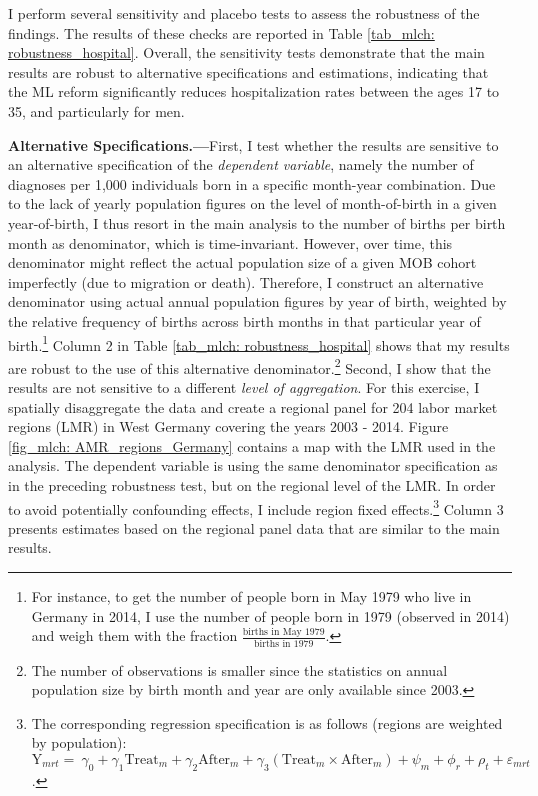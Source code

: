 I perform several sensitivity and placebo tests to assess the robustness of the findings. The results of these checks are reported in Table \ref{tab_mlch: robustness_hospital}. Overall, the sensitivity tests demonstrate that the main results are robust to alternative specifications and estimations, indicating that the ML reform significantly reduces hospitalization rates between the ages 17 to 35, and particularly for men.\newline

\afterpage{

}

\textbf{Alternative Specifications.---}First, I test whether the results are sensitive to an alternative specification of the \textit{dependent variable}, namely the number of diagnoses per 1,000 individuals born in a specific month-year combination. Due to the lack of yearly population figures on the level of month-of-birth in a given year-of-birth, I thus resort in the main analysis to the number of births per birth month as denominator, which is time-invariant. However, over time, this denominator might reflect the actual population size of a given MOB cohort imperfectly (due to migration or death). Therefore, I construct an alternative denominator using actual annual population figures by year of birth, weighted by the relative frequency of births across birth months in that particular year of birth.\footnote{For instance, to get the number of people born in May 1979 who live in Germany in 2014, I use the number of people born in 1979 (observed in 2014) and weigh them with the fraction $\frac{\text{births in May 1979}}{\text{births in 1979}}$.} Column 2 in Table \ref{tab_mlch: robustness_hospital} shows that my results are robust to the use of this alternative denominator.\footnote{The number of observations is smaller since the statistics on annual population size by birth month and year are only available since 2003.} Second, I show that the results are not sensitive to a different \textit{level of aggregation}. For this exercise, I spatially disaggregate the data and create a regional panel for 204 labor market regions (LMR) in West Germany covering the years 2003 - 2014. Figure \ref{fig_mlch: AMR_regions_Germany} contains a map with the LMR used in the analysis. The dependent variable is using the same denominator specification as in the preceding robustness test, but on the regional level of the LMR. In order to avoid potentially confounding effects, I include region fixed effects.\footnote{The corresponding regression specification is as follows (regions are weighted by population):\newline $\text{Y}_{mrt} =\ \gamma_0 + \gamma_1 \text{Treat}_{m} + \gamma_2 \text{After}_{m} + \gamma_3 (\text{Treat}_{m} \times \text{After}_{m}) + \psi_m + \phi_r + \rho_t + \varepsilon_{mrt} \label{eq_mlch:DD_LMR}$.} Column 3 presents estimates based on the regional panel data that are similar to the main results. \newline
